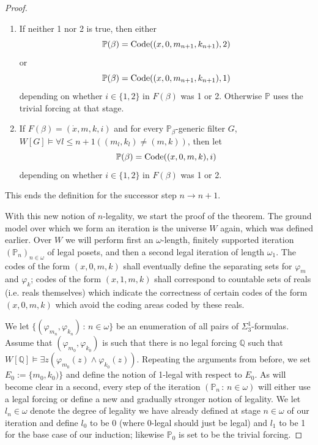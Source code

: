 \documentclass[10pt,a4paper]{amsart}
\newcommand{\forceP}{\mathbb{P}}
\newcommand{\forceQ}{\mathbb{Q}}
\begin{document}
\begin{proof}
\begin{enumerate}
Then continuing to argue in $W[G_{\beta}]$, we force with
\[\forceP(\beta):= \hbox{Code}((x,0,m_{n+1},k_{n+1}),2).\] 




\item If neither 1 nor 2 is true, then either \[ \forceP(\beta)=\hbox{Code}((x,0,m_{n+1},k_{n+1}),2)\] or 
\[ \forceP(\beta)=\hbox{Code}((x,0,m_{n+1},k_{n+1}),1)\] depending on whether $ i\in\{1,2\}$ in $F(\beta)$ was 1 or 2. Otherwise $\forceP$ uses the trivial forcing at that stage. 

\item 
If $F(\beta) = (\dot{x},m,k,i)$ and for every $\forceP_{\beta}$-generic filter $G$, $W[G] \models \forall l \le n+1 ((m_l,k_l) \ne (m,k))$,
then let
\[ \forceP(\beta)=\hbox{Code}((x,0,m,k),i)\] depending on whether $ i\in\{1,2\}$ in $F(\beta)$ was 1 or 2.  
\end{enumerate} 
This ends the definition for the successor step $n \rightarrow n+1$.

With this new notion of $n$-legality, we start the proof of the theorem. The ground model over which we form an iteration is the universe $W$ again, which was defined earlier. Over $W$ we will perform first an $\omega$-length, finitely supported iteration $(\forceP_n)_{n \in \omega}$ of legal posets, and then a second legal iteration of length $\omega_1$. The codes of the form $(x,0,m,k)$ shall eventually define the separating sets for $\varphi_m$ and $\varphi_k$; codes of the form $(x,1,m,k)$ shall correspond to countable sets of reals  (i.e. reals themselves) which indicate the correctness of certain codes of the form $(x,0,m,k)$ which avoid the coding areas coded by these reals.

We let $\{(\varphi_{m_n}, \varphi_{k_n}) \, : \, n \in \omega \}$ be an enumeration of all pairs of $\Sigma^1_3$-formulas. Assume that $(\varphi_{m_0}, \varphi_{k_0})$ is such that there is no legal forcing $\forceQ$ such that $W[\forceQ] \models \exists z (\varphi_{m_0}(z) \land \varphi_{k_0}(z))$. Repeating the arguments from before, we set $E_0:=\{m_0,k_0) \}$ and define the notion of 1-legal with respect to $E_0$.
As will become clear in a second, every step of the iteration $(\forceP_n \, : \, {n \in\omega})$ will either use a legal forcing or define a new and gradually stronger notion of legality. We let $l_n \in \omega$ denote the degree of legality we have already defined at stage $n \in \omega$ of our iteration and define $l_0$ to be $0$ (where 0-legal should just be legal) and $l_1$ to be 1 for the base case of our induction; likewise $\forceP_0$ is set to be the trivial forcing.


\end{proof}
\end{document}
